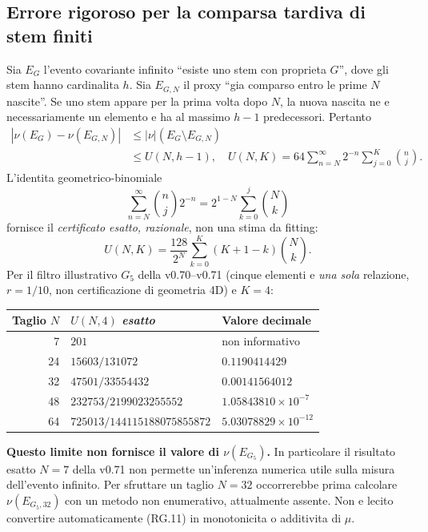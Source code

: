 \documentclass[11pt,a4paper]{article}
\begin{document}
\clearpage
\subsection*{Errore rigoroso per la comparsa tardiva di stem finiti}
Sia $E_G$ l'evento covariante infinito ``esiste uno stem con proprieta $G$'', dove gli stem hanno cardinalita $h$. Sia $E_{G,N}$ il proxy ``gia comparso entro le prime $N$ nascite''. Se uno stem appare per la prima volta dopo $N$, la nuova nascita ne e necessariamente un elemento e ha al massimo $h-1$ predecessori. Pertanto
\begin{equation}
\begin{split}
|\nu(E_G)-\nu(E_{G,N})|&\le |\nu|(E_G\setminus E_{G,N})\\
&\le U(N,h-1),\quad
U(N,K)=64\sum_{n=N}^{\infty}2^{-n}\sum_{j=0}^{K}\binom nj.
\end{split}\tag{RG.9}
\end{equation}
L'identita geometrico-binomiale
\begin{equation}
\sum_{n=N}^{\infty}\binom nj2^{-n}=
2^{1-N}\sum_{k=0}^{j}\binom Nk
\tag{RG.10}
\end{equation}
fornisce il \emph{certificato esatto, razionale}, non una stima da fitting:
\begin{equation}
\boxed{\quad U(N,K)=\frac{128}{2^N}
\sum_{k=0}^{K}(K+1-k)\binom Nk.\quad}
\tag{RG.11}
\end{equation}
Per il filtro illustrativo $G_5$ della v0.70--v0.71 (cinque elementi e \emph{una sola} relazione, $r=1/10$, non certificazione di geometria 4D) e $K=4$:
\begin{center}\small
\begin{tabular}{rll}
\toprule
Taglio $N$ & $U(N,4)$ \emph{esatto} & Valore decimale \\\midrule
7 & $201$ & non informativo \\
24 & $15603/131072$ & $0.1190414429$ \\
32 & $47501/33554432$ & $0.00141564012$ \\
48 & $232753/2199023255552$ & $1.05843810\times10^{-7}$ \\
64 & $725013/144115188075855872$ & $5.03078829\times10^{-12}$ \\
\bottomrule
\end{tabular}
\end{center}
\textbf{Questo limite non fornisce il valore di $\nu(E_{G_5})$.} In particolare il risultato esatto $N=7$ della v0.71 non permette un'inferenza numerica utile sulla misura dell'evento infinito. Per sfruttare un taglio $N=32$ occorrerebbe prima calcolare $\nu(E_{G_5,32})$ con un metodo non enumerativo, attualmente assente. Non e lecito convertire automaticamente (RG.11) in monotonicita o additivita di $\mu$.
\end{document}
